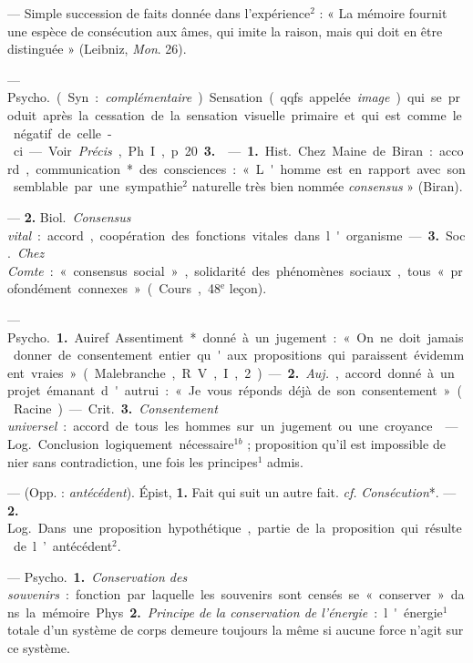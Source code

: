 \begin{itemize}[leftmargin=1cm, label=, itemsep=11pt]
 — Simple succession de
faits donnée dans l'expérience$^2$ :
« La mémoire fournit une espèce de
consécution aux âmes, qui imite la
raison, mais qui doit en être distinguée » (Leibniz, {\it Mon}. 26).

 — \si{Psycho.}
(Syn. : {\it complémentaire}) Sensation
(qqfs appelée {\it image}) qui se produit
après la cessation de la sensation
visuelle primaire et qui est comme
le négatif de celle-ci. — Voir  {\it Précis},
Ph. I, p. 20 {\bf 3.}

 — {\bf 1.} \si{Hist.} Chez Maine de
Biran : accord, communication*
des consciences : « L'homme est en
rapport avec son semblable par une
sympathie$^2$ naturelle très bien
nommée {\it consensus} » (Biran).

— {\bf 2.} \si{Biol.} {\it Consensus vital} : accord, coopération des fonctions vitales dans l'organisme.

— {\bf 3.} \si{Soc.} {\it Chez Comte} : « consensus
social », solidarité des phénomènes
sociaux, tous « profondément connexes » (Cours, 48$^\text{e}$ leçon).

 — \si{Psycho.} {\bf 1.} Auiref.
Assentiment* donné à un jugement : « On ne doit jamais donner de
consentement entier qu'aux propositions qui paraissent évidemment
vraies » (Malebranche, R. V., I, 2). —
 {\bf 2.}  {\it Auj.}, accord donné à un projet
émanant d'autrui : « Je vous réponds
déjà de son consentement » (Racine).

— \si{Crit.} {\bf 3.} {\it Consentement universel} : accord de tous les hommes
sur un jugement ou une croyance.

 — \si{Log.} Conclusion logiquement nécessaire$^{1b}$ ; proposition
qu’il est impossible de nier sans
contradiction, une fois les principes$^1$
admis.

 — (Opp. : {\it antécédent}).
Épist, {\bf 1.} Fait qui suit un autre fait.
{\it cf.} {\it Consécution}*. — {\bf 2.} \si{Log.} Dans
une proposition hypothétique, partie
de la proposition qui résulte de
l’antécédent$^2$.

 — \si{Psycho.} {\bf 1.} {\it Conservation des souvenirs} : fonction par
laquelle les souvenirs sont censés se
« conserver » dans la mémoire.

Phys. {\bf 2.} {\it Principe de la conservation de l’énergie} : l'énergie$^1$ totale
d’un système de corps demeure toujours la même si aucune force n’agit
sur ce système.


\end{itemize}
